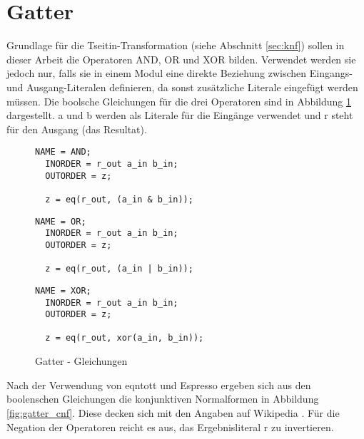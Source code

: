 \section{Gatter}
\label{sec:knf:gatter}

Grundlage für die Tseitin-Transformation (siehe Abschnitt \ref{sec:knf}) sollen in dieser Arbeit die Operatoren AND, OR und XOR bilden. Verwendet werden sie jedoch
nur, falls sie in einem Modul eine direkte Beziehung zwischen Eingangs- und Ausgang-Literalen definieren, da sonst zusätzliche Literale eingefügt werden müssen.
Die boolsche Gleichungen für die drei Operatoren sind in Abbildung \ref{fig:gatter_equations} dargestellt. a und b werden als Literale für die Eingänge verwendet
und r steht für den Ausgang (das Resultat).

\begin{figure}[!h]
  \centering
  \begin{minipage}[c]{4.85cm}
    \begin{lstlisting}[]
  NAME = AND;
  INORDER = r_out a_in b_in;
  OUTORDER = z;

  z = eq(r_out, (a_in & b_in));
    \end{lstlisting}
  \end{minipage}
  \begin{minipage}[c]{4.85cm}
    \begin{lstlisting}[]
  NAME = OR;
  INORDER = r_out a_in b_in;
  OUTORDER = z;

  z = eq(r_out, (a_in | b_in));
    \end{lstlisting}
  \end{minipage}
  \begin{minipage}[c]{5.1cm}
    \begin{lstlisting}[]
  NAME = XOR;
  INORDER = r_out a_in b_in;
  OUTORDER = z;

  z = eq(r_out, xor(a_in, b_in));
    \end{lstlisting}
  \end{minipage}
  \caption{Gatter - Gleichungen}
  \label{fig:gatter_equations}
\end{figure}

Nach der Verwendung von eqntott und Espresso ergeben sich aus den boolenschen Gleichungen die konjunktiven Normalformen in Abbildung \ref{fig:gatter_cnf}.
Diese decken sich mit den Angaben auf Wikipedia \cite{wiki:tseitin}. Für die Negation der Operatoren reicht es aus, das Ergebnisliteral r zu invertieren.

